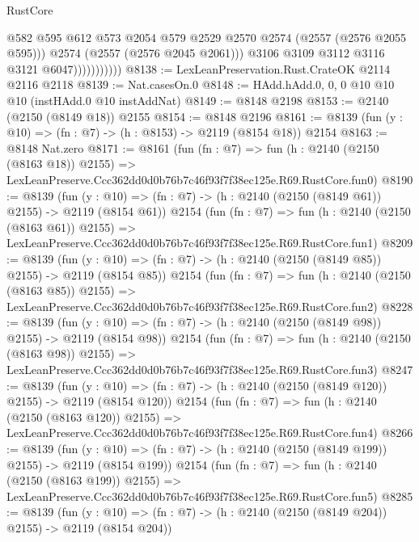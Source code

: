 \begin{lexlean}{RustCore}
\begin{coremodule}
                              @582
                              @595
                              @612
                              @573
                              @2054
                              @579
                              @2529
                              @2570
                              @2574
                              (@2557 (@2576 @2055 @595)))
                            @2574
                            (@2557 (@2576 @2045 @2061)))
                          @3106
                          @3109
                          @3112
                          @3116
                          @3121
                          @6047)))))))))))
@8138 := LexLeanPreservation.Rust.CrateOK @2114 @2116 @2118
@8139 := Nat.casesOn.{0}
@8148 := HAdd.hAdd.{0, 0, 0} @10 @10 @10 (instHAdd.{0} @10 instAddNat)
@8149 := @8148 @2198
@8153 := @2140 (@2150 (@8149 @18)) @2155
@8154 := @8148 @2196
@8161 := @8139 (fun (y : @10) => (fn : @7) -> (h : @8153) -> @2119 (@8154 @18)) @2154
@8163 := @8148 Nat.zero
@8171 := @8161
    (fun (fn : @7) =>
    fun (h : @2140 (@2150 (@8163 @18)) @2155) =>
    LexLeanPreserve.Ccc362dd0d0b76b7c46f93f7f38ec125e.R69.RustCore.fun0)
@8190 := @8139
    (fun (y : @10) => (fn : @7) -> (h : @2140 (@2150 (@8149 @61)) @2155) -> @2119 (@8154 @61))
    @2154
    (fun (fn : @7) =>
    fun (h : @2140 (@2150 (@8163 @61)) @2155) =>
    LexLeanPreserve.Ccc362dd0d0b76b7c46f93f7f38ec125e.R69.RustCore.fun1)
@8209 := @8139
    (fun (y : @10) => (fn : @7) -> (h : @2140 (@2150 (@8149 @85)) @2155) -> @2119 (@8154 @85))
    @2154
    (fun (fn : @7) =>
    fun (h : @2140 (@2150 (@8163 @85)) @2155) =>
    LexLeanPreserve.Ccc362dd0d0b76b7c46f93f7f38ec125e.R69.RustCore.fun2)
@8228 := @8139
    (fun (y : @10) => (fn : @7) -> (h : @2140 (@2150 (@8149 @98)) @2155) -> @2119 (@8154 @98))
    @2154
    (fun (fn : @7) =>
    fun (h : @2140 (@2150 (@8163 @98)) @2155) =>
    LexLeanPreserve.Ccc362dd0d0b76b7c46f93f7f38ec125e.R69.RustCore.fun3)
@8247 := @8139
    (fun (y : @10) => (fn : @7) -> (h : @2140 (@2150 (@8149 @120)) @2155) -> @2119 (@8154 @120))
    @2154
    (fun (fn : @7) =>
    fun (h : @2140 (@2150 (@8163 @120)) @2155) =>
    LexLeanPreserve.Ccc362dd0d0b76b7c46f93f7f38ec125e.R69.RustCore.fun4)
@8266 := @8139
    (fun (y : @10) => (fn : @7) -> (h : @2140 (@2150 (@8149 @199)) @2155) -> @2119 (@8154 @199))
    @2154
    (fun (fn : @7) =>
    fun (h : @2140 (@2150 (@8163 @199)) @2155) =>
    LexLeanPreserve.Ccc362dd0d0b76b7c46f93f7f38ec125e.R69.RustCore.fun5)
@8285 := @8139
    (fun (y : @10) => (fn : @7) -> (h : @2140 (@2150 (@8149 @204)) @2155) -> @2119 (@8154 @204))

\end{coremodule}
\end{lexlean}
